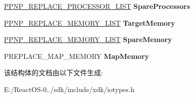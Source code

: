 \begin{DoxyCompactItemize}
\hyperlink{struct___p_n_p___r_e_p_l_a_c_e___p_r_o_c_e_s_s_o_r___l_i_s_t}{P\+P\+N\+P\+\_\+\+R\+E\+P\+L\+A\+C\+E\+\_\+\+P\+R\+O\+C\+E\+S\+S\+O\+R\+\_\+\+L\+I\+ST} {\bfseries Spare\+Processors}
\item 
\mbox{\label{struct___p_n_p___r_e_p_l_a_c_e___p_a_r_a_m_e_t_e_r_s_a8047c14ec2d4bfef5c592e064cf52bf3}} 
\hyperlink{struct___p_n_p___r_e_p_l_a_c_e___m_e_m_o_r_y___l_i_s_t}{P\+P\+N\+P\+\_\+\+R\+E\+P\+L\+A\+C\+E\+\_\+\+M\+E\+M\+O\+R\+Y\+\_\+\+L\+I\+ST} {\bfseries Target\+Memory}
\item 
\mbox{\label{struct___p_n_p___r_e_p_l_a_c_e___p_a_r_a_m_e_t_e_r_s_adef0a90595de265483b071328bc6c591}} 
\hyperlink{struct___p_n_p___r_e_p_l_a_c_e___m_e_m_o_r_y___l_i_s_t}{P\+P\+N\+P\+\_\+\+R\+E\+P\+L\+A\+C\+E\+\_\+\+M\+E\+M\+O\+R\+Y\+\_\+\+L\+I\+ST} {\bfseries Spare\+Memory}
\item 
\mbox{\label{struct___p_n_p___r_e_p_l_a_c_e___p_a_r_a_m_e_t_e_r_s_a30e42de3fe4e34faed3c41b5a20030ba}} 
P\+R\+E\+P\+L\+A\+C\+E\+\_\+\+M\+A\+P\+\_\+\+M\+E\+M\+O\+RY {\bfseries Map\+Memory}
\end{DoxyCompactItemize}


该结构体的文档由以下文件生成\+:\begin{DoxyCompactItemize}
\item 
E\+:/\+React\+O\+S-\/0../sdk/include/xdk/iotypes.\+h\end{DoxyCompactItemize}
